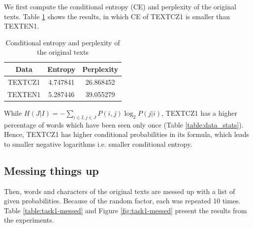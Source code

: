 \documentclass{article}
\begin{document}
We first compute the conditional entropy (CE) and perplexity of the original texts. Table \ref{table:task1-org} shows the results, in which CE of TEXTCZ1 is smaller than TEXTEN1.

\begin{table}[h]
\centering
\begin{tabular}{| c | c | c |} 
 \hline
 Data & Entropy & Perplexity \\
 \hline
 TEXTCZ1 & 4.747841 & 26.868452 \\
 TEXTEN1 & 5.287446 & 39.055279 \\
 \hline
\end{tabular}
\caption{Conditional entropy and perplexity of the original texts}
\label{table:task1-org}
\end{table}

While $H(J|I)=-\sum_{i\in I,j\in J}P(i,j)\log_2 P(j|i)$, TEXTCZ1 has a higher percentage of words which have been seen only once (Table \ref{table:data_stats}). Hence, TEXTCZ1 has higher conditional probabilities in its formula, which leads to smaller negative logarithms i.e. smaller conditional entropy.

\subsection{Messing things up}

Then, words and characters of the original texts are messed up with a list of given probabilities. Because of the random factor, each was repeated 10 times. Table \ref{table:task1-messed} and Figure \ref{fig:task1-messed} present the results from the experiments.
\end{document}
